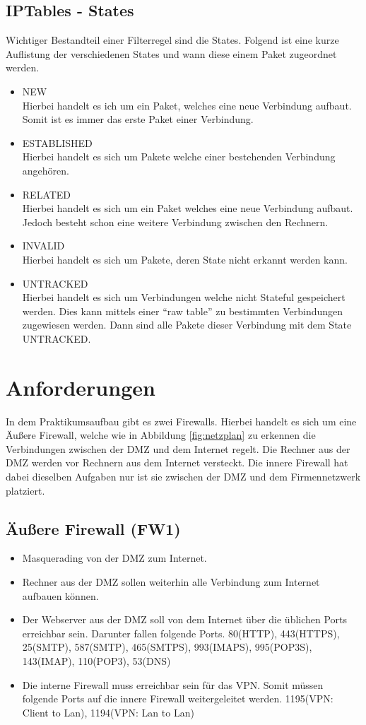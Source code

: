 \subsection{IPTables - States}
Wichtiger Bestandteil einer Filterregel sind die States. Folgend ist eine kurze Auflistung der verschiedenen States und wann diese einem Paket zugeordnet werden.
\begin{itemize} 
	\item NEW \\
	Hierbei handelt es ich um ein Paket, welches eine neue Verbindung aufbaut. Somit ist es immer das erste Paket einer Verbindung.
	\item ESTABLISHED \\
	Hierbei handelt es sich um Pakete welche einer bestehenden Verbindung angehören.
	\item RELATED \\
	Hierbei handelt es sich um ein Paket welches eine neue Verbindung aufbaut. Jedoch besteht schon eine weitere Verbindung zwischen den Rechnern.
	\item INVALID \\
	Hierbei handelt es sich um Pakete, deren State nicht erkannt werden kann.
	\item UNTRACKED \\
	Hierbei handelt es sich um Verbindungen welche nicht Stateful gespeichert werden. Dies kann mittels einer "`raw table"' zu bestimmten Verbindungen zugewiesen werden. Dann sind alle Pakete dieser Verbindung mit dem State UNTRACKED.
\end{itemize} 

\section{Anforderungen}
In dem Praktikumsaufbau gibt es zwei Firewalls. Hierbei handelt es sich um eine Äußere Firewall, welche wie in Abbildung \ref{fig:netzplan} zu erkennen die Verbindungen zwischen der DMZ und dem Internet regelt. Die Rechner aus der DMZ werden vor Rechnern aus dem Internet versteckt. Die innere Firewall hat dabei dieselben Aufgaben nur ist sie zwischen der DMZ und dem Firmennetzwerk platziert.

\subsection{Äußere Firewall (FW1)}
\begin{itemize}
\item Masquerading von der DMZ zum Internet.
\item Rechner aus der DMZ sollen weiterhin alle Verbindung zum Internet aufbauen können.
\item Der Webserver aus der DMZ soll von dem Internet über die üblichen Ports erreichbar sein. Darunter fallen folgende Ports. 80(HTTP), 443(HTTPS), 25(SMTP), 587(SMTP), 465(SMTPS), 993(IMAPS), 995(POP3S), 143(IMAP), 110(POP3), 53(DNS)
\item Die interne Firewall muss erreichbar sein für das VPN. Somit müssen folgende Ports auf die innere Firewall weitergeleitet werden. 1195(VPN: Client to Lan), 1194(VPN: Lan to Lan)
\end{itemize}

